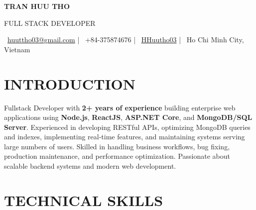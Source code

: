 \documentclass[11pt,a4paper]{article}
\begin{document}

\begin{center}

{\Huge \textbf{TRAN HUU THO}}

\vspace{4pt}

{\large FULL STACK DEVELOPER}

\vspace{8pt}

{
\faEnvelope\ 
\href{mailto:huuttho03@gmail.com}{huuttho03@gmail.com}
\hspace{10pt}|\hspace{10pt}
\faPhone\ 
 +84-375874676
\hspace{10pt}|\hspace{10pt}
\faGithub\ 
\href{https://github.com/HHuutho03}{HHuutho03}
\hspace{10pt}|\hspace{10pt}
\faMapMarker*\ 
Ho Chi Minh City, Vietnam
}

\end{center}

\vspace{6pt}

\section*{INTRODUCTION}

Fullstack Developer with \textbf{2+ years of experience} building enterprise web applications using \textbf{Node.js}, \textbf{ReactJS}, \textbf{ASP.NET Core}, and \textbf{MongoDB/SQL Server}. Experienced in developing RESTful APIs, optimizing MongoDB queries and indexes, implementing real-time features, and maintaining systems serving large numbers of users. Skilled in handling business workflows, bug fixing, production maintenance, and performance optimization. Passionate about scalable backend systems and modern web development.
\section*{TECHNICAL SKILLS}
\end{document}

